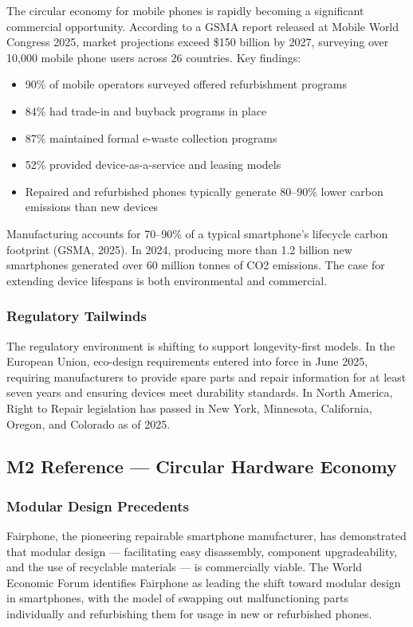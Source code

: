 \documentclass[11pt,letterpaper]{article}
\begin{document}
The circular economy for mobile phones is rapidly becoming a significant commercial opportunity. According to a GSMA report released at Mobile World Congress 2025, market projections exceed \$150 billion by 2027, surveying over 10,000 mobile phone users across 26 countries. Key findings:

\begin{itemize}[noitemsep]
  \item 90\% of mobile operators surveyed offered refurbishment programs
  \item 84\% had trade-in and buyback programs in place
  \item 87\% maintained formal e-waste collection programs
  \item 52\% provided device-as-a-service and leasing models
  \item Repaired and refurbished phones typically generate 80--90\% lower carbon emissions than new devices
\end{itemize}

Manufacturing accounts for 70--90\% of a typical smartphone's lifecycle carbon footprint (GSMA, 2025). In 2024, producing more than 1.2 billion new smartphones generated over 60 million tonnes of CO2 emissions. The case for extending device lifespans is both environmental and commercial.

\subsubsection{Regulatory Tailwinds}

The regulatory environment is shifting to support longevity-first models. In the European Union, eco-design requirements entered into force in June 2025, requiring manufacturers to provide spare parts and repair information for at least seven years and ensuring devices meet durability standards. In North America, Right to Repair legislation has passed in New York, Minnesota, California, Oregon, and Colorado as of 2025.

\subsection{M2 Reference --- Circular Hardware Economy}

\subsubsection{Modular Design Precedents}

Fairphone, the pioneering repairable smartphone manufacturer, has demonstrated that modular design --- facilitating easy disassembly, component upgradeability, and the use of recyclable materials --- is commercially viable. The World Economic Forum identifies Fairphone as leading the shift toward modular design in smartphones, with the model of swapping out malfunctioning parts individually and refurbishing them for usage in new or refurbished phones.
\end{document}
